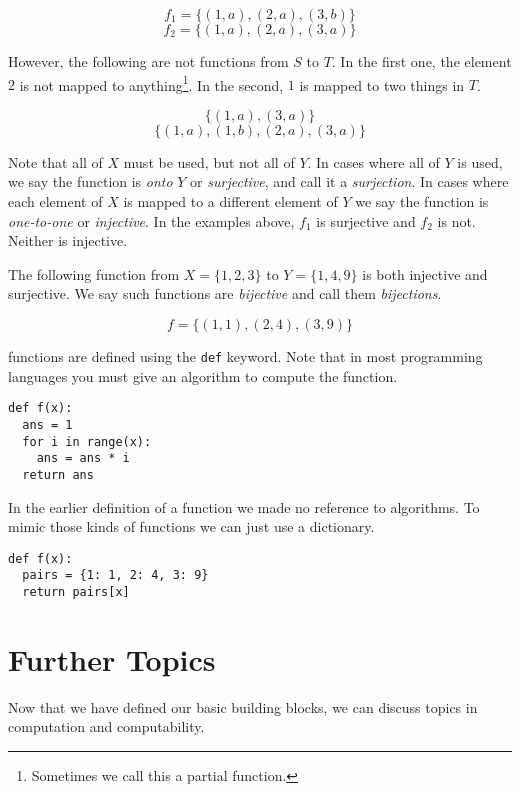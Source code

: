\documentclass{iansnotes}
\begin{document}
  \[ f_1 = \{ (1, a), (2, a), (3, b) \} \]
  \[ f_2 = \{ (1, a), (2, a), (3, a) \} \]

  However, the following are not functions from $S$ to $T$.
  In the first one, the element $2$ is not mapped to anything\footnote{Sometimes we call this a partial function.}.
  In the second, $1$ is mapped to two things in $T$.

  \[ \{ (1, a), (3, a) \} \]
  \[ \{ (1, a), (1, b), (2, a), (3, a) \} \]

  Note that all of $X$ must be used, but not all of $Y$.
  In cases where all of $Y$ is used, we say the function is \emph{onto} $Y$ or \emph{surjective}, and call it a \emph{surjection}.
  In cases where each element of $X$ is mapped to a different element of $Y$ we say the function is \emph{one-to-one} or \emph{injective}.
  In the examples above, $f_1$ is surjective and $f_2$ is not.
  Neither is injective.

  The following function from $X = \{1, 2, 3\}$ to $Y = \{1, 4, 9\}$ is both injective and surjective.
  We say such functions are \emph{bijective} and call them \emph{bijections}.

  \[ f = \{(1,1), (2,4), (3,9) \} \]
  
   functions are defined using the \texttt{def} keyword.
  Note that in most programming languages you must give an algorithm to compute the function.
  \begin{verbatim}
def f(x):
  ans = 1
  for i in range(x):
    ans = ans * i
  return ans
  \end{verbatim}
  In the earlier definition of a function we made no reference to algorithms.
  To mimic those kinds of functions we can just use a dictionary.
  \begin{verbatim}
def f(x):
  pairs = {1: 1, 2: 4, 3: 9}
  return pairs[x]
  \end{verbatim}

\section{Further Topics}
  Now that we have defined our basic building blocks, we can discuss topics in computation and computability.
\end{document}
